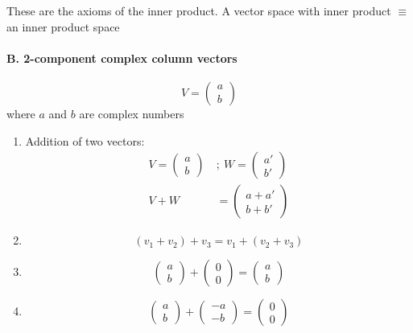 \documentclass[a4paper,11pt,normalem]{article}
\begin{document}
These are the axioms of the inner product.
A vector space with inner product \(\equiv\) an inner product space

\paragraph{B. 2-component complex column vectors}\label{b.-2-component-complex-column-vectors}

\[
    V = \begin{pmatrix} a \\ b \end{pmatrix}
\]
where \(a\) and \(b\) are complex numbers

\begin{enumerate}
\item
  Addition of two vectors: \[
  \begin{aligned}
  V = \begin{pmatrix} a \\ b \end{pmatrix} ~&;~ W = \begin{pmatrix} a' \\ b' \end{pmatrix} \\
  V + W &= \begin{pmatrix} a + a' \\ b + b' \end{pmatrix}
  \end{aligned}
  \]
\item
  \[(v_1 + v_2) + v_3 = v_1 + (v_2 + v_3)\]
\item
  \[\begin{pmatrix} a \\ b\end{pmatrix} + \begin{pmatrix} 0 \\ 0 \end{pmatrix} = \begin{pmatrix} a \\ b \end{pmatrix}\]
\item
  \[\begin{pmatrix} a \\ b\end{pmatrix} + \begin{pmatrix} -a \\ -b \end{pmatrix} = \begin{pmatrix} 0 \\ 0 \end{pmatrix}\]

\end{enumerate}
\end{document}
